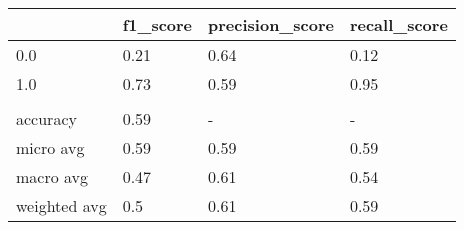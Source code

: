 \begin{tabular}{llll}
\toprule
{} & f1\_score & precision\_score & recall\_score \\
\midrule
0.0          &     0.21 &            0.64 &         0.12 \\
1.0          &     0.73 &            0.59 &         0.95 \\
             &          &                 &              \\
accuracy     &     0.59 &               - &            - \\
micro avg    &     0.59 &            0.59 &         0.59 \\
macro avg    &     0.47 &            0.61 &         0.54 \\
weighted avg &      0.5 &            0.61 &         0.59 \\
\bottomrule
\end{tabular}
